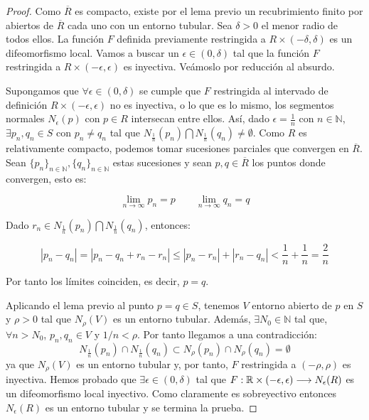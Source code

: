 \begin{proof}
Como $\overline{R}$ es compacto, existe por el lema previo un recubrimiento finito por abiertos de $\overline{R}$ cada uno con un entorno tubular. Sea $\delta > 0$ el menor radio de todos ellos. La función $F$ definida previamente restringida a $R \times (-\delta, \delta)$ es un difeomorfismo local. Vamos a buscar un $\epsilon \in (0,\delta)$ tal que la función $F$ restringida a $R \times (-\epsilon, \epsilon)$ es inyectiva. Veámoslo por reducción al absurdo.

Supongamos que $\forall \epsilon \in (0,\delta)$ se cumple que $F$ restringida al intervado de definición $R \times (-\epsilon, \epsilon)$ no es inyectiva, o lo que es lo mismo, los segmentos normales $N_\epsilon(p)$ con $p \in R$ intersecan entre ellos. Así, dado $\epsilon=\frac{1}{n}$ con $n \in \mathbb{N}$, $\exists p_n,q_n \in S$ con $p_n \neq q_n$ tal que $N_{\frac{1}{n}}(p_n) \bigcap N_{\frac{1}{n}}(q_n) \neq \emptyset$.
Como $R$ es relativamente compacto, podemos tomar sucesiones parciales que convergen en $\overline{R}$. Sean $\{p_n\}_{n \in \mathbb{N}}, \{q_n\}_{n \in \mathbb{N}}$ estas sucesiones y sean $p,q \in \overline{R}$ los puntos donde convergen, esto es:

\begin{equation*}
    \lim_{n\to\infty} p_n = p \qquad \lim_{n\to\infty} q_n = q
\end{equation*}

Dado $r_n \in N_{\frac{1}{n}}(p_n) \bigcap N_{\frac{1}{n}}(q_n)$, entonces:

\begin{equation*}
    |p_n - q_n| = |p_n - q_n + r_n - r_n| \leq |p_n-r_n| + |r_n-q_n| < \frac{1}{n}+\frac{1}{n} = \frac{2}{n}
\end{equation*}

Por tanto los límites coinciden, es decir, $p=q$.

Aplicando el lema previo al punto $p = q \in S$, tenemos $V$ entorno abierto de $p$ en $S$ y $\rho > 0$ tal que $N_\rho(V)$ es un entorno tubular. Además, $\exists N_0 \in \mathbb{N}$ tal que, $\forall n > N_0$, $p_n,q_n \in V$ y $1/n < \rho$. Por tanto llegamos a una contradicción:
%
\begin{equation*}
    N_{\frac{1}{n}}(p_n) \cap N_{\frac{1}{n}}(q_n) \subset N_\rho(p_n)\cap N_\rho(q_n) = \emptyset
\end{equation*}
%
ya que $N_\rho(V)$ es un entorno tubular y, por tanto, $F$ restringida a $(-\rho, \rho)$ es inyectiva. Hemos probado que $\exists \epsilon \in (0, \delta)$ tal que $F: \mathbb{R} \times (-\epsilon, \epsilon) \longrightarrow N_\epsilon(R)$ es un difeomorfismo local inyectivo. Como claramente es sobreyectivo entonces $N_\epsilon(R)$ es un entorno tubular y se termina la prueba.
\end{proof}

